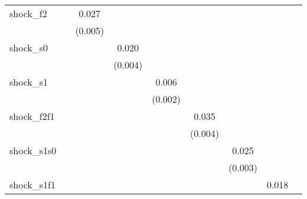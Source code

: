 {\begin{tabular}{l*{8}{c}}
\addlinespace
shock\_f2    &                     &       0.027\sym{***}&                     &                     &                     &                     &                     &                     \\
            &                     &     (0.005)         &                     &                     &                     &                     &                     &                     \\
\addlinespace
shock\_s0    &                     &                     &       0.020\sym{***}&                     &                     &                     &                     &                     \\
            &                     &                     &     (0.004)         &                     &                     &                     &                     &                     \\
\addlinespace
shock\_s1    &                     &                     &                     &       0.006\sym{**} &                     &                     &                     &                     \\
            &                     &                     &                     &     (0.002)         &                     &                     &                     &                     \\
\addlinespace
shock\_f2f1  &                     &                     &                     &                     &       0.035\sym{***}&                     &                     &                     \\
            &                     &                     &                     &                     &     (0.004)         &                     &                     &                     \\
\addlinespace
shock\_s1s0  &                     &                     &                     &                     &                     &       0.025\sym{***}&                     &                     \\
            &                     &                     &                     &                     &                     &     (0.003)         &                     &                     \\
\addlinespace
shock\_s1f1  &                     &                     &                     &                     &                     &                     &       0.018\sym{***}&                     \\

\end{tabular}}
